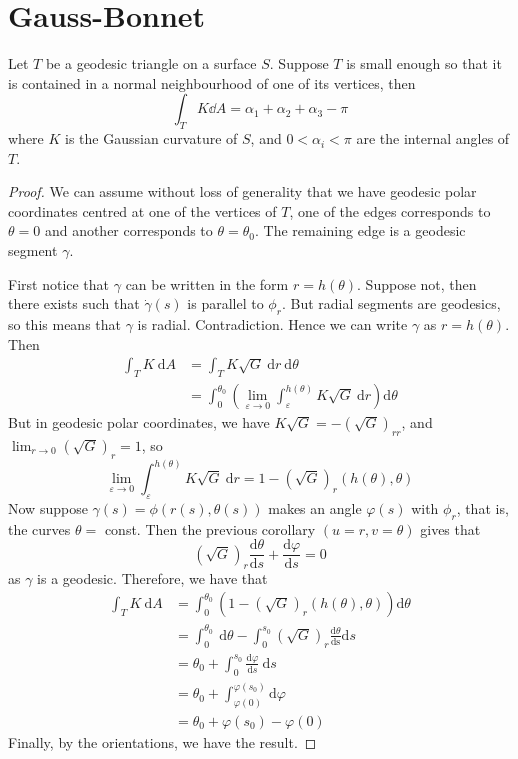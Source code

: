 \documentclass[10pt]{article}
\begin{document}
\section{Gauss-Bonnet}

\begin{theorem}
    Let $T$ be a geodesic triangle on a surface $S$. Suppose $T$ is small enough so that it is contained in a normal neighbourhood of one of its vertices, then
$$
\int_T K \dd A=\alpha_1+\alpha_2+\alpha_3-\pi
$$
where $K$ is the Gaussian curvature of $S$, and $0<\alpha_i<\pi$ are the internal angles of $T$.
\end{theorem}
\begin{proof}
We can assume without loss of generality that we have geodesic polar coordinates centred at one of the vertices of $T$, one of the edges corresponds to $\theta=0$ and another corresponds to $\theta=\theta_0$. The remaining edge is a geodesic segment $\gamma$.

First notice that $\gamma$ can be written in the form $r=h(\theta)$. Suppose not, then there exists such that $\dot{\gamma}(s)$ is parallel to $\phi_r$. But radial segments are geodesics, so this means that $\gamma$ is radial. Contradiction. Hence we can write $\gamma$ as $r=h(\theta)$. Then
\begin{align*}
\int_T K \mathrm{~d} A&=\int_T K \sqrt{G} \mathrm{~d} r \mathrm{~d} \theta\\
&=\int_0^{\theta_0}\left(\lim _{\varepsilon \rightarrow 0} \int_{\varepsilon}^{h(\theta)} K \sqrt{G} \mathrm{~d} r\right) \mathrm{d} \theta
\end{align*}
But in geodesic polar coordinates, we have $K \sqrt{G}=-(\sqrt{G})_{r r}$, and $\lim _{r \rightarrow 0}(\sqrt{G})_r=1$, so
$$
\lim _{\varepsilon \rightarrow 0} \int_{\varepsilon}^{h(\theta)} K \sqrt{G} \mathrm{~d} r=1-(\sqrt{G})_r(h(\theta), \theta)
$$
Now suppose $\gamma(s)=\phi(r(s), \theta(s))$ makes an angle $\varphi(s)$ with $\phi_r$, that is, the curves $\theta=$ const. Then the previous corollary $(u=r, v=\theta)$ gives that
$$
(\sqrt{G})_r \frac{\mathrm{d} \theta}{\mathrm{d} s}+\frac{\mathrm{d} \varphi}{\mathrm{d} s}=0
$$
as $\gamma$ is a geodesic. Therefore, we have that
$$
\begin{aligned}
\int_T K \mathrm{~d} A & =\int_0^{\theta_0}\left(1-(\sqrt{G})_r(h(\theta), \theta)\right) \mathrm{d} \theta \\
& =\int_0^{\theta_0} \mathrm{~d} \theta-\int_0^{s_0}(\sqrt{G})_r \frac{\mathrm{d} \theta}{\mathrm{ds}} \mathrm{d} s \\
& =\theta_0+\int_0^{s_0} \frac{\mathrm{d} \varphi}{\mathrm{d} s} \mathrm{~d} s \\
& =\theta_0+\int_{\varphi(0)}^{\varphi\left(s_0\right)} \mathrm{d} \varphi \\
& =\theta_0+\varphi\left(s_0\right)-\varphi(0)
\end{aligned}
$$
Finally, by the orientations, we have the result.
\end{proof}
\end{document}
